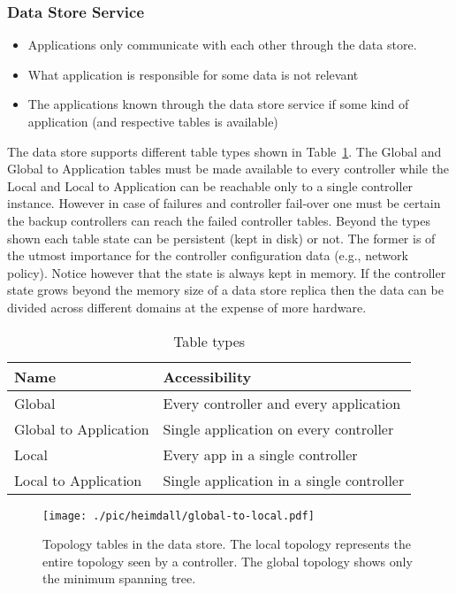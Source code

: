 \subsubsection{Data Store Service}

\begin{itemize}
\item Applications only communicate with each other through the data store. 
\item What application is responsible for some data is not relevant
\item The applications known through the data store service if some kind of application (and respective tables is available) 
\end{itemize}


The data store supports different table types shown in Table~\ref{tab:table-types}. The Global and Global to Application tables must be made available to every controller while the Local and Local to Application can be reachable only to a single controller instance. However in case of failures and controller fail-over one must be certain the backup controllers can reach the failed controller tables. Beyond the types shown each table state can be persistent (kept in disk) or not. The former is of the utmost importance for the controller configuration data (e.g., network policy). Notice however that the state is always kept in memory. If the controller state grows beyond the memory size  of a data store replica then the data can be divided across different domains at the expense of more hardware. 

\begin{table}[ht]
  \centering
  \begin{tabular}{ll}
    Name & Accessibility \\ \toprule 
    Global & Every controller and every application   \\ 
    Global to Application & Single application on every controller \\
    Local & Every app in a single controller \\
    Local to Application &  Single application in a single controller \\ \bottomrule 
  \end{tabular}
  \caption{Table types}
  \label{tab:table-types}
\end{table}


\begin{figure}[ht]
  \centering
  \texttt{[image: ./pic/heimdall/global-to-local.pdf]}  
  \caption{Topology tables in the data store. The local topology represents the entire topology seen by a controller. The global topology shows only the minimum spanning tree.}
  \label{fig:topologies}
\end{figure}

